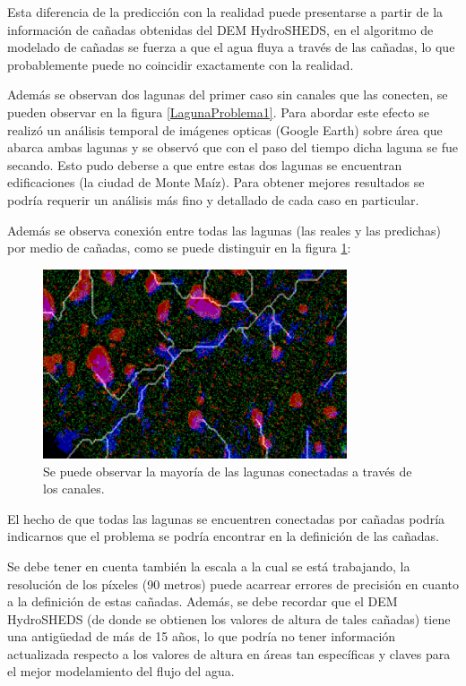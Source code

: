 \documentclass[10pt,a4paper, twoside]{report}
\begin{document}
Esta diferencia de la predicción con la realidad puede presentarse a partir de la información de cañadas obtenidas del DEM HydroSHEDS, en el algoritmo de modelado de cañadas se fuerza a que el agua fluya a través de las cañadas, lo que probablemente puede no coincidir exactamente con la realidad.

Además se observan dos lagunas del primer caso sin canales que las conecten, se pueden observar en la figura \ref{LagunaProblema1}. Para abordar este efecto se realizó un análisis temporal de imágenes opticas (Google Earth) sobre área que abarca ambas lagunas y se observó que con el paso del tiempo dicha laguna se fue secando. Esto pudo deberse a que entre estas dos lagunas se encuentran edificaciones (la ciudad de Monte Maíz). Para obtener mejores resultados se podría requerir un análisis más fino y detallado de cada caso en particular.


Además se observa conexión entre todas las lagunas (las reales y las predichas) por medio de cañadas, como se puede distinguir en la figura \ref{LagunaProblema2}:

\begin{figure}[!htb]
   \centering      
   \includegraphics[width=0.8\textwidth]{imagenes/LagunaProblema2.jpg}
 \caption{Se puede observar la mayoría de las lagunas conectadas a través de los canales.}
 \label{LagunaProblema2}
\end{figure}

El hecho de que todas las lagunas se encuentren conectadas por cañadas podría indicarnos que el problema se podría encontrar en la definición de las cañadas.

Se debe tener en cuenta también la escala a la cual se está trabajando, la resolución de los píxeles (90 metros) puede acarrear errores de precisión en cuanto a la definición de estas cañadas. Además, se debe recordar que el DEM HydroSHEDS (de donde se obtienen los valores de altura de tales cañadas) tiene una antigüedad de más de 15 años, lo que podría no tener información actualizada respecto a los valores de altura en áreas tan específicas y claves para el mejor modelamiento del flujo del agua.
\end{document}
